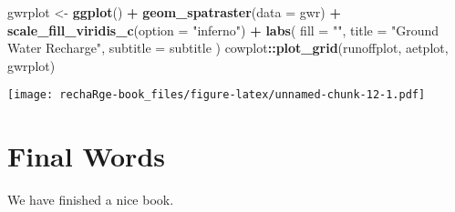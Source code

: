 \documentclass[
]{book}
\newenvironment{Shaded}{\begin{snugshade}}{\end{snugshade}}
\newcommand{\AttributeTok}[1]{\textcolor[rgb]{0.13,0.29,0.53}{#1}}
\newcommand{\FunctionTok}[1]{\textcolor[rgb]{0.13,0.29,0.53}{\textbf{#1}}}
\newcommand{\NormalTok}[1]{#1}
\newcommand{\OtherTok}[1]{\textcolor[rgb]{0.56,0.35,0.01}{#1}}
\newcommand{\SpecialCharTok}[1]{\textcolor[rgb]{0.81,0.36,0.00}{\textbf{#1}}}
\newcommand{\StringTok}[1]{\textcolor[rgb]{0.31,0.60,0.02}{#1}}
\begin{document}
\begin{Shaded}
\begin{Highlighting}[]
\NormalTok{gwrplot }\OtherTok{\textless{}{-}} \FunctionTok{ggplot}\NormalTok{() }\SpecialCharTok{+}
  \FunctionTok{geom\_spatraster}\NormalTok{(}\AttributeTok{data =}\NormalTok{ gwr) }\SpecialCharTok{+}
  \FunctionTok{scale\_fill\_viridis\_c}\NormalTok{(}\AttributeTok{option =} \StringTok{"inferno"}\NormalTok{) }\SpecialCharTok{+}
  \FunctionTok{labs}\NormalTok{(}
    \AttributeTok{fill =} \StringTok{""}\NormalTok{,}
    \AttributeTok{title =} \StringTok{"Ground Water Recharge"}\NormalTok{,}
    \AttributeTok{subtitle =}\NormalTok{ subtitle}
\NormalTok{  )}
\NormalTok{cowplot}\SpecialCharTok{::}\FunctionTok{plot\_grid}\NormalTok{(runoffplot, aetplot, gwrplot)}
\end{Highlighting}
\end{Shaded}

\texttt{[image: rechaRge-book\_files/figure-latex/unnamed-chunk-12-1.pdf]}

\hypertarget{final-words}{%
\chapter{Final Words}\label{final-words}}

We have finished a nice book.

  
\end{document}
